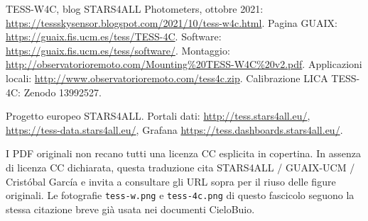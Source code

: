 \documentclass[11pt,a4paper]{report}
\begin{document}
TESS-W4C, blog STARS4ALL Photometers, ottobre 2021: \url{https://tessskysensor.blogspot.com/2021/10/tess-w4c.html}. Pagina GUAIX: \url{https://guaix.fis.ucm.es/tess/TESS-4C}. Software: \url{https://guaix.fis.ucm.es/tess/software/}. Montaggio: \url{http://observatorioremoto.com/Mounting\%20TESS-W4C\%20v2.pdf}. Applicazioni locali: \url{http://www.observatorioremoto.com/tess4c.zip}. Calibrazione LICA TESS-4C: Zenodo 13992527.

Progetto europeo STARS4ALL. Portali dati: \url{http://tess.stars4all.eu/}, \url{https://tess-data.stars4all.eu/}, Grafana \url{https://tess.dashboards.stars4all.eu/}.

I PDF originali non recano tutti una licenza CC esplicita in copertina. In assenza di licenza CC dichiarata, questa traduzione cita STARS4ALL / GUAIX-UCM / Cristóbal García e invita a consultare gli URL sopra per il riuso delle figure originali. Le fotografie \texttt{tess-w.png} e \texttt{tess-4c.png} di questo fascicolo seguono la stessa citazione breve già usata nei documenti CieloBuio.
\end{document}
